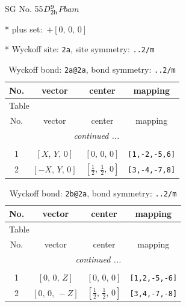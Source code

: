 \documentclass[fleqn,8pt]{jsarticle}
\begin{document}
\setcounter{MaxMatrixCols}{32}

\renewcommand{\tablename}{Table~}
\renewcommand{\figurename}{Figure~}
\begin{center}
\LARGE
SG No. 55\quad$D_{\rm 2h}^{9}$\quad$Pbam$\quad[ orthorhombic ]
\end{center}

* plus set:\,\,\,$+\left[ 0,\, 0,\, 0 \right]$


* Wyckoff site: {\tt 2a}, site symmetry: {\tt ..2/m}
\renewcommand{\arraystretch}{1.2}
\begin{longtable}{cccc}
\caption{Wyckoff bond: {\tt 2a@2a}, bond symmetry: {\tt ..2/m}}
 \\
 \hline \hline
No. & vector & center & mapping \\ \hline \endfirsthead

\multicolumn{3}{l}{\tablename\ \thetable{}} \\
 \hline \hline
No. & vector & center & mapping \\ \hline \endhead

 \hline \hline
\multicolumn{3}{r}{\footnotesize\it continued ...} \\ \endfoot

 \hline \hline
\multicolumn{3}{r}{} \\ \endlastfoot

1 & $\left[ X,\, Y,\, 0 \right]$ & $\left[ 0,\, 0,\, 0 \right]$ & {\tt [1,-2,-5,6]} \\ \hline
2 & $\left[ - X,\, Y,\, 0 \right]$ & $\left[ \frac{1}{2},\, \frac{1}{2},\, 0 \right]$ & {\tt [3,-4,-7,8]} \\
\end{longtable}
\renewcommand{\arraystretch}{1.2}
\begin{longtable}{cccc}
\caption{Wyckoff bond: {\tt 2b@2a}, bond symmetry: {\tt ..2/m}}
 \\
 \hline \hline
No. & vector & center & mapping \\ \hline \endfirsthead

\multicolumn{3}{l}{\tablename\ \thetable{}} \\
 \hline \hline
No. & vector & center & mapping \\ \hline \endhead

 \hline \hline
\multicolumn{3}{r}{\footnotesize\it continued ...} \\ \endfoot

 \hline \hline
\multicolumn{3}{r}{} \\ \endlastfoot

1 & $\left[ 0,\, 0,\, Z \right]$ & $\left[ 0,\, 0,\, 0 \right]$ & {\tt [1,2,-5,-6]} \\ \hline
2 & $\left[ 0,\, 0,\, - Z \right]$ & $\left[ \frac{1}{2},\, \frac{1}{2},\, 0 \right]$ & {\tt [3,4,-7,-8]} \\
\end{longtable}
\end{document}
